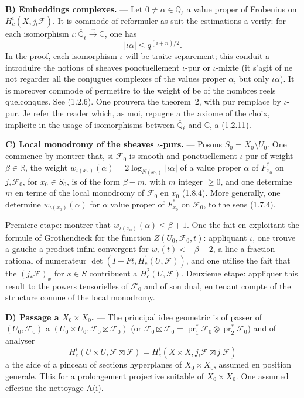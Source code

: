 \documentclass[12pt,a4paper]{article}
\theoremstyle{plain}
\theoremstyle{definition}
\theoremstyle{definition}
\theoremstyle{remark}
\DeclareMathOperator{\pr}{pr}
\begin{document}
\medskip
\textbf{B) Embeddings complexes.} --- Let $0 \neq \alpha \in \overline{\mathbb{Q}}_\ell$ a value proper of Frobenius on $H_c^i(X, j_! \mathscr{F})$. It is commode of reformuler as suit the estimations a verify: for each isomorphism $\iota: \overline{\mathbb{Q}}_\ell \xrightarrow{\sim} \mathbb{C}$, one has
\[|\iota\alpha| \leq q^{(i+n)/2}.\]
In the proof, each isomorphism $\iota$ will be traite separement; this conduit a introduire the notions of sheaves ponctuellement $\iota$-pur or $\iota$-mixte (it s'agit of ne not regarder all the conjugues complexes of the values proper $\alpha$, but only $\iota\alpha$). It is moreover commode of permettre to the weight of be of the nombres reels quelconques. See (1.2.6). One prouvera the theorem~2, with pur remplace by $\iota$-pur. Je refer the reader which, as moi, repugne a the axiome of the choix, implicite in the usage of isomorphisms between $\overline{\mathbb{Q}}_\ell$ and $\mathbb{C}$, a (1.2.11).

\medskip
\textbf{C) Local monodromy of the sheaves $\iota$-purs.} --- Posons $S_0 = X_0 \setminus U_0$. One commence by montrer that, si $\mathscr{F}_0$ is smooth and ponctuellement $\iota$-pur of weight $\beta \in \mathbb{R}$, the weight $w_{\iota(x_0)}(\alpha) = 2\log_{N(x_0)}|\iota\alpha|$ of a value proper $\alpha$ of $F_{x_0}^*$ on $j_* \mathscr{F}_0$, for $x_0 \in S_0$, is of the form $\beta - m$, with $m$ integer $\geq 0$, and one determine $m$ en terme of the local monodromy of $\mathscr{F}_0$ en $x_0$ (1.8.4). More generally, one determine $w_{\iota(x_0)}(\alpha)$ for $\alpha$ value proper of $F_{x_0}^*$ on $\mathscr{F}_0$, to the sens (1.7.4).

Premiere etape: montrer that $w_{\iota(x_0)}(\alpha) \leq \beta + 1$. One the fait en exploitant the formule of Grothendieck for the function $Z(U_0, \mathscr{F}_0, t)$: appliquant $\iota$, one trouve a gauche a product infini convergent for $w_\iota(t) < -\beta - 2$, a line a fraction rational of numerateur $\det(I - Ft, H_c^1(U, \mathscr{F}))$, and one utilise the fait that the $(j_* \mathscr{F})_x$ for $x \in S$ contribuent a $H_c^2(U, \mathscr{F})$. Deuxieme etape: appliquer this result to the powers tensorielles of $\mathscr{F}_0$ and of son dual, en tenant compte of the structure connue of the local monodromy.

\medskip
\textbf{D) Passage a $X_0 \times X_0$.} --- The principal idee geometric is of passer of $(U_0, \mathscr{F}_0)$ a $(U_0 \times U_0, \mathscr{F}_0 \boxtimes \mathscr{F}_0)$ (or $\mathscr{F}_0 \boxtimes \mathscr{F}_0 = \pr_1^* \mathscr{F}_0 \otimes \pr_2^* \mathscr{F}_0$) and of analyser
\[H_c^i(U \times U, \mathscr{F} \boxtimes \mathscr{F}) = H_c^i(X \times X, j_! \mathscr{F} \boxtimes j_! \mathscr{F})\]
a the aide of a pinceau of sections hyperplanes of $X_0 \times X_0$, assumed en position generale. This for a prolongement projective suitable of $X_0 \times X_0$. One assumed effectue the nettoyage A(i).
\end{document}
